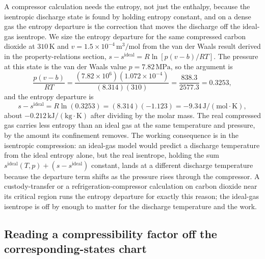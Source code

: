 A compressor calculation needs the entropy, not just the enthalpy, because
the isentropic discharge state is found by holding entropy constant, and on
a dense gas the entropy departure is the correction that moves the discharge
off the ideal-gas isentrope. We size the entropy departure for the same
compressed carbon dioxide at $310\,\si{\kelvin}$ and $v = 1.5\times
10^{-4}\,\text{m}^3/\text{mol}$ from the van der Waals result derived in the
property-relations section, $s - s^{\text{ideal}} = R\ln[p(v-b)/RT]$. The
pressure at this state is the van der Waals value $p = 7.82\,\text{MPa}$, so
the argument is
\[
\frac{p(v-b)}{RT} = \frac{(7.82\times 10^6)(1.072\times 10^{-4})}{(8.314)
(310)} = \frac{838.3}{2577.3} = 0.3253,
\]
and the entropy departure is
\[
s - s^{\text{ideal}} = R\ln(0.3253) = (8.314)(-1.123) = -9.34\,\text{J}/
(\text{mol}\cdot\si{\kelvin}),
\]
about $-0.212\,\text{kJ}/(\text{kg}\cdot\si{\kelvin})$ after dividing by the
molar mass. The real compressed gas carries less entropy than an ideal gas
at the same temperature and pressure, by the amount its confinement removes.
The working consequence is in the isentropic compression: an ideal-gas model
would predict a discharge temperature from the ideal entropy alone, but the
real isentrope, holding the sum $s^{\text{ideal}}(T,p) + (s -
s^{\text{ideal}})$ constant, lands at a different discharge temperature
because the departure term shifts as the pressure rises through the
compressor. A custody-transfer or a refrigeration-compressor calculation on
carbon dioxide near its critical region runs the entropy departure for
exactly this reason; the ideal-gas isentrope is off by enough to matter for
the discharge temperature and the work.

\subsection{Reading a compressibility factor off the corresponding-states
chart}


